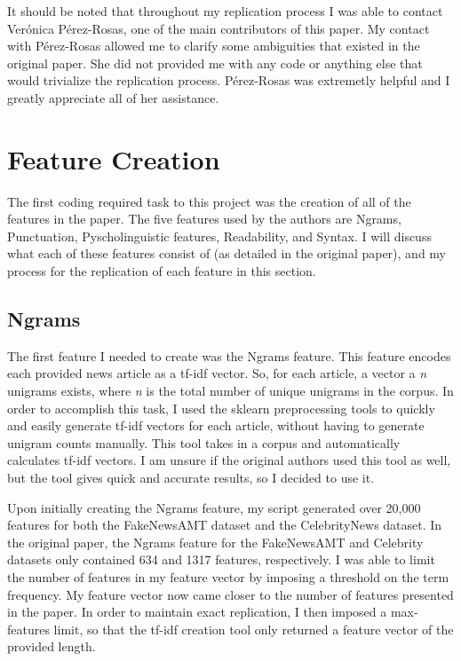 \documentclass{article}
\begin{document}
It should be noted that throughout my replication process I was able to contact Ver\'onica P\'erez-Rosas, one of the main contributors of this paper. My contact with P\'erez-Rosas allowed me to clarify some ambiguities that existed in the original paper. She did not provided me with any code or anything else that would trivialize the replication process. P\'erez-Rosas was extremetly helpful and I greatly appreciate all of her assistance. 

\section{Feature Creation}

The first coding required task to this project was the creation of all of the features in the paper. The five features used by the authors are Ngrams, Punctuation, Pyscholinguistic features, Readability, and Syntax. I will discuss what each of these features consist of (as detailed in the original paper), and my process for the replication of each feature in this section.

\subsection{Ngrams}

The first feature I needed to create was the Ngrams feature. This feature encodes each provided news article as a tf-idf vector. So, for each article, a vector a \emph{n} unigrams exists, where \emph{n} is the total number of unique unigrams in the corpus. In order to accomplish this task, I used the sklearn preprocessing tools to quickly and easily generate tf-idf vectors for each article, without having to generate unigram counts manually. This tool takes in a corpus and automatically calculates tf-idf vectors. I am unsure if the original authors used this tool as well, but the tool gives quick and accurate results, so I decided to use it.

Upon initially creating the Ngrams feature, my script generated over 20,000 features for both the FakeNewsAMT dataset and the CelebrityNews dataset. In the original paper, the Ngrams feature for the FakeNewsAMT and Celebrity datasets only contained 634 and 1317 features, respectively. I was able to limit the number of features in my feature vector by imposing a threshold on the term frequency. My feature vector now came closer to the number of features presented in the paper. In order to maintain exact replication, I then imposed a max-features limit, so that the tf-idf creation tool only returned a feature vector of the provided length. 
\end{document}
